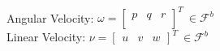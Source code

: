 \documentclass[a4paper, 11pt, oneside, openright, parskip=full]{book}
\begin{document}
\\
Angular Velocity: $\omega=\begin{bmatrix}
p & q & r\\
\end{bmatrix}^T~\in\mathcal{F}^b$
\\
Linear Velocity: $\nu=\begin{bmatrix}
u & v & w
\end{bmatrix}^T~\in\mathcal{F}^b$
\tableofcontents

\listoffigures

\listoftables



\mainmatter










\backmatter


\raggedright



\end{document}

